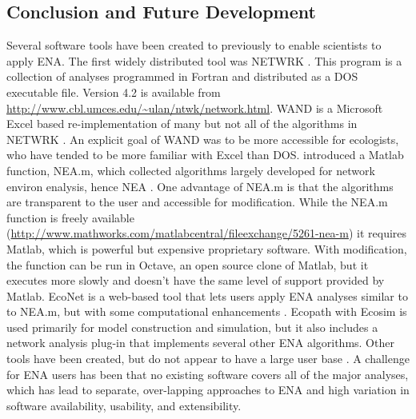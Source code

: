 \documentclass[11pt]{article}
\begin{document}
\begin{spacing}{2}
\section{Conclusion and Future Development}
Several software tools have been created to previously to enable
scientists to apply ENA. The first widely distributed tool was NETWRK
\citep{ulanowicz91}.  This program is a collection of analyses
programmed in Fortran and distributed as a DOS executable
file. Version 4.2 is available from
\url{http://www.cbl.umces.edu/~ulan/ntwk/network.html}. WAND is a
Microsoft Excel based re-implementation of many but not all of the
algorithms in NETWRK \citep{allesina04_wand}. An explicit goal of WAND
was to be more accessible for ecologists, who have tended to be more
familiar with Excel than DOS.  \citet{fath06} introduced a Matlab
function, NEA.m, which collected algorithms largely developed for
network environ enalysis, hence NEA \citep{patten91}.  One advantage
of NEA.m is that the algorithms are transparent to the user and
accessible for modification.  While the NEA.m function is freely
available
(\url{http://www.mathworks.com/matlabcentral/fileexchange/5261-nea-m})
it requires Matlab, which is powerful but expensive proprietary
software.  With modification, the function can be run in Octave, an
open source clone of Matlab, but it executes more slowly and doesn't
have the same level of support provided by Matlab.  EcoNet is a
web-based tool that lets users apply ENA analyses similar to to NEA.m,
but with some computational enhancements \citep{kazanci07,
  schramski11}.  Ecopath with Ecosim \citep{christensen92,
  christensen04} is used primarily for model construction and
simulation, but it also includes a network analysis plug-in that
implements several other ENA algorithms.  Other tools have been
created, but do not appear to have a large user base
\citep{latham2006,kones09}. A challenge for ENA users has been that no
existing software covers all of the major analyses, which has lead to
separate, over-lapping approaches to ENA and high variation in
software availability, usability, and extensibility.


\end{spacing}
\end{document}

